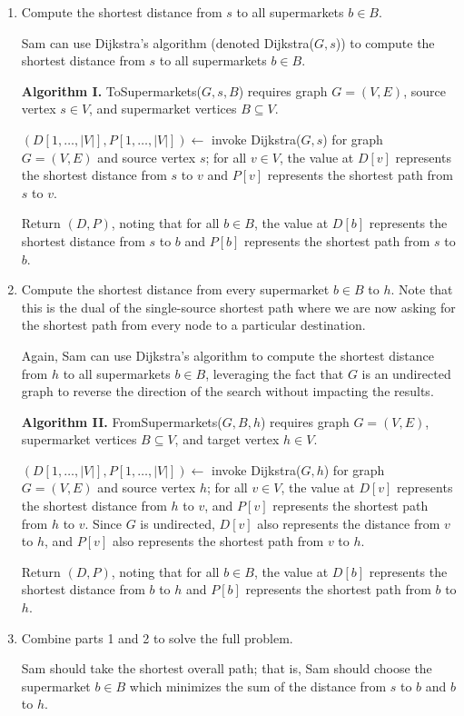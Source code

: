 \begin{enumerate}
\item Compute the shortest distance from $s$ to all supermarkets $b \in B$.
\begin{solution}
Sam can use Dijkstra's algorithm (denoted {\sc Dijkstra}($G,s$)) to compute the shortest distance from $s$ to all supermarkets $b\in B$.

\textbf{Algorithm I. }{\sc ToSupermarkets}($G,s,B$) requires graph $G=(V,E)$, source vertex $s\in V$, and supermarket vertices $B\subseteq V$.

$(D[1,\dots,|V|],P[1,\dots,|V|])\leftarrow$ invoke {\sc Dijkstra}($G,s$) for graph $G=(V,E)$ and source vertex $s$; for all $v\in V$, the value at $D[v]$ represents the shortest distance from $s$ to $v$ and $P[v]$ represents the shortest path from $s$ to $v$.

Return $(D,P)$, noting that for all $b\in B$, the value at $D[b]$ represents the shortest distance from $s$ to $b$ and $P[b]$ represents the shortest path from $s$ to $b$.
\end{solution}
\item Compute the shortest distance from every supermarket $b \in B$ to $h$. Note that this is the dual of the single-source shortest path where we are now asking for the shortest path from every node to a particular destination.
\begin{solution}
Again, Sam can use Dijkstra's algorithm to compute the shortest distance from $h$ to all supermarkets $b\in B$, leveraging the fact that $G$ is an undirected graph to reverse the direction of the search without impacting the results.

\textbf{Algorithm II. }{\sc FromSupermarkets}($G,B,h$) requires graph $G=(V,E)$, supermarket vertices $B\subseteq V$, and target vertex $h\in V$.

$(D[1,\dots,|V|],P[1,\dots,|V|])\leftarrow $ invoke {\sc Dijkstra}($G,h$) for graph $G=(V,E)$ and source vertex $h$; for all $v\in V$, the value at $D[v]$ represents the shortest distance from $h$ to $v$, and $P[v]$ represents the shortest path from $h$ to $v$. Since $G$ is undirected, $D[v]$ also represents the distance from $v$ to $h$, and $P[v]$ also represents the shortest path from $v$ to $h$.

Return $(D,P)$, noting that for all $b\in B$, the value at $D[b]$ represents the shortest distance from $b$ to $h$ and $P[b]$ represents the shortest path from $b$ to $h$.
\end{solution}
\newpage
\item Combine parts 1 and 2 to solve the full problem.
\begin{solution}
Sam should take the shortest overall path; that is, Sam should choose the supermarket $b\in B$ which minimizes the sum of the distance from $s$ to $b$ and $b$ to $h$.


\end{solution}
\end{enumerate}
